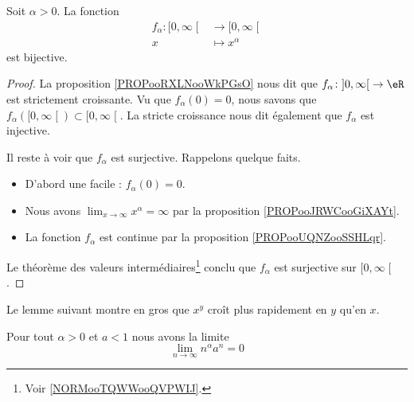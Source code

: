\begin{proposition}     \label{PROPooEXGKooCqzLor}
    Soit \( \alpha>0\). La fonction
    \begin{equation}
        \begin{aligned}
            f_{\alpha}\colon \mathopen[ 0 , \infty \mathclose[&\to \mathopen[ 0 , \infty \mathclose[ \\
                x&\mapsto x^{\alpha} 
        \end{aligned}
    \end{equation}
    est bijective.
\end{proposition}

\begin{proof}
La proposition \ref{PROPooRXLNooWkPGsO} nous dit que \( f_{\alpha}\colon \mathopen] 0 , \infty \mathclose[\to \eR\) est strictement croissante. Vu que  \( f_{\alpha}(0)=0\), nous savons que \( f_{\alpha}(\mathopen[ 0 , \infty \mathclose[)\subset\mathopen[ 0 , \infty \mathclose[\). La stricte croissance nous dit également que \( f_{\alpha}\) est injective.

    Il reste à voir que \( f_{\alpha}\) est surjective. Rappelons quelque faits.
    \begin{itemize}
        \item D'abord une facile :     \( f_{\alpha}(0)=0\). 
        \item 
            Nous avons \( \lim_{x\to \infty} x^{\alpha}=\infty\) par la proposition \ref{PROPooJRWCooGiXAYt}. 
        \item
            La fonction \( f_{\alpha}\) est continue par la proposition \ref{PROPooUQNZooSSHLqr}.
    \end{itemize}
    Le théorème des valeurs intermédiaires\footnote{Voir \ref{NORMooTQWWooQVPWIJ}.} conclu que \( f_{\alpha}\) est surjective sur \( \mathopen[ 0 , \infty \mathclose[\).
\end{proof}

Le lemme suivant montre en gros que \( x^y\) croît plus rapidement en \( y\) qu'en \( x\). 
\begin{lemma}       \label{LemLJOSooEiNtTs}
     Pour tout \( \alpha>0\) et \( a<1\) nous avons la limite
     \begin{equation}
         \lim_{n\to \infty} n^{\alpha}a^n=0
     \end{equation}
\end{lemma}


